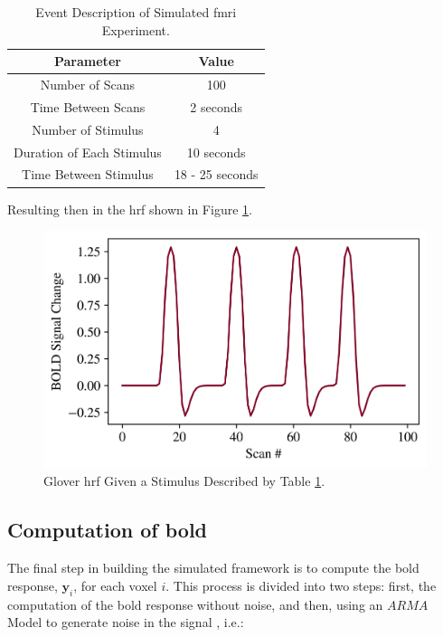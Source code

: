 \begin{table}[htbp!]
\centering
\caption{Event Description of Simulated \gls{fmri} Experiment.}
\begin{tabular}{cc}
\hline
\textbf{Parameter} & \textbf{Value} \\ \hline
Number of Scans & 100 \\
Time Between Scans & 2 seconds \\
Number of Stimulus & 4 \\
Duration of Each Stimulus & 10 seconds \\
Time Between Stimulus & 18 - 25 seconds \\ \hline
\end{tabular}
\label{tab:eventsSim}
\end{table}

Resulting then in the \gls{hrf} shown in Figure \ref{fig:gloverHRF}.

\begin{figure}[htbp!]
\centering
\includegraphics{images/gloverHRF.png}
\caption{Glover \gls{hrf} Given a Stimulus Described by Table \ref{tab:eventsSim}.}
\label{fig:gloverHRF}
\end{figure}

\subsection{Computation of \texorpdfstring{\gls{bold}}{BOLD}}

The final step in building the simulated framework is to compute the \gls{bold} response, $\bm{y}_i$, for each voxel $i$. This process is divided into two steps: first, the computation of the \gls{bold} response without noise, and then, using an $ARMA$ Model to generate noise in the signal \cite{choi2012arma}, i.e.:

